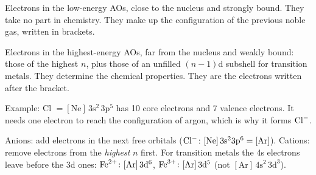 \begin{concept}
Electrons in the low-energy AOs, close to the nucleus and strongly bound. They take no part in
chemistry. They make up the configuration of the previous noble gas, written in brackets.
\end{concept}
\begin{concept}
Electrons in the highest-energy AOs, far from the nucleus and weakly bound: those of the highest $n$,
plus those of an unfilled $(n-1)$d subshell for transition metals. They determine the chemical
properties. They are the electrons written after the bracket.
\end{concept}
Example: Cl $= [\mathrm{Ne}]\,3\mathrm s^2\,3\mathrm p^5$ has 10 core electrons and 7 valence electrons.
It needs one electron to reach the configuration of argon, which is why it forms $\ce{Cl-}$.
\begin{concept}
Anions: add electrons in the next free orbitals ($\ce{Cl-}\colon [\mathrm{Ne}]\,3\mathrm s^2 3\mathrm p^6 =
[\mathrm{Ar}]$). Cations: remove electrons from the \emph{highest} $n$ first. For transition metals the
4s electrons leave before the 3d ones: $\ce{Fe^2+}\colon [\mathrm{Ar}]\,3\mathrm d^6$,
$\ce{Fe^3+}\colon [\mathrm{Ar}]\,3\mathrm d^5$ (not $[\mathrm{Ar}]\,4\mathrm s^2\,3\mathrm d^3$).
\end{concept}

